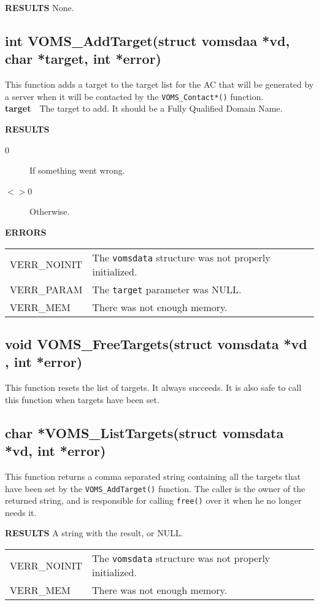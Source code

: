 \documentclass[a4paper]{book}
\newcommand{\errors}{\noindent \textbf{ERRORS}\newline}
\newcommand{\result}{\noindent \textbf{RESULTS}\newline}
\newcommand{\parameter}[1]{\newline\textbf{#1}\ \ }
\begin{document}
\result
None.

\subsection{int VOMS\_AddTarget(struct vomsdaa *vd, char *target, int
  *error)}

This function adds a target to the target list for the AC that will be
generated by a server when it will be contacted by the \verb|VOMS_Contact*()|
function. 
\parameter{target}{The target to add.  It should be a Fully Qualified
  Domain Name.}

\result
\begin{description}
\item[0] If something went wrong.
\item[$<>$0] Otherwise.
\end{description}

\errors
\bigskip\begin{tabular}{lp{3in}}
VERR\_NOINIT & The \verb|vomsdata| structure was not properly
initialized.\\
VERR\_PARAM  & The \verb|target| parameter was NULL.\\
VERR\_MEM    & There was not enough memory.\\
\end{tabular}

\subsection{void VOMS\_FreeTargets(struct vomsdata *vd , int *error)}

This function resets the list of targets. It always succeeds.  It is
also safe to call this function when targets have been set.

\subsection{char *VOMS\_ListTargets(struct vomsdata *vd, int *error)}

This function returns a comma separated string containing all the
targets that have been set by the \verb|VOMS_AddTarget()| function.
The caller is the owner of the returned string, and is responsible for
calling \verb|free()| over it when he no longer needs it.

\result
A string with the result, or NULL.

\bigskip\begin{tabular}{lp{3in}}
VERR\_NOINIT & The \verb|vomsdata| structure was not properly
initialized.\\
VERR\_MEM    & There was not enough memory.\\
\end{tabular}
\end{document}

